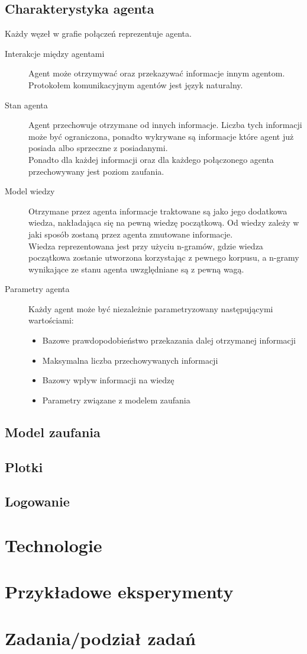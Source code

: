 \documentclass{article}
\begin{document}
	\subsection{Charakterystyka agenta}
	Każdy węzeł w grafie połączeń reprezentuje agenta.
	\begin{description}
		\item[Interakcje między agentami]
		Agent może otrzymywać oraz przekazywać informacje innym agentom.
		Protokołem komunikacyjnym agentów jest język naturalny.
		\item[Stan agenta]
		Agent przechowuje otrzymane od innych informacje.
		Liczba tych informacji może być ograniczona,
		ponadto wykrywane są informacje które agent już posiada albo sprzeczne z posiadanymi.\\
		Ponadto dla każdej informacji oraz dla każdego połączonego agenta przechowywany jest poziom zaufania.
		\item[Model wiedzy]
		Otrzymane przez agenta informacje traktowane są jako jego dodatkowa wiedza,
		nakładająca się na pewną wiedzę początkową. 
		Od wiedzy zależy w jaki sposób zostaną przez agenta zmutowane informacje.\\
		Wiedza reprezentowana jest przy użyciu n-gramów,
		gdzie wiedza początkowa zostanie utworzona korzystając z pewnego korpusu,
		a n-gramy wynikające ze stanu agenta uwzględniane są z pewną wagą.
		\item[Parametry agenta] Każdy agent może być niezależnie parametryzowany następującymi wartościami:
		\begin{itemize}
			\item{Bazowe prawdopodobieństwo przekazania dalej otrzymanej informacji}
			\item{Maksymalna liczba przechowywanych informacji}
			\item{Bazowy wpływ informacji na wiedzę}
			\item{Parametry związane z modelem zaufania}
		\end{itemize}
	\end{description}
	\subsection{Model zaufania}
	\subsection{Plotki}
	\subsection{Logowanie}
	\section{Technologie}
	\section{Przykładowe eksperymenty}
	\section{Zadania/podział zadań}
\end{document}

